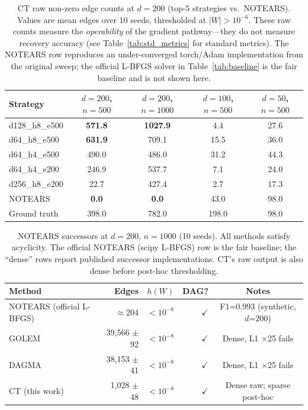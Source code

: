\documentclass[12pt,a4paper]{article}
\begin{document}
\begin{table}[H]
\centering
\caption{CT raw non-zero edge counts at $d=200$ (top-5 strategies vs.\ NOTEARS). Values are mean edges over 10 seeds, thresholded at $|W|>10^{-6}$. These raw counts measure the \emph{operability} of the gradient pathway---they do not measure recovery accuracy (see Table~\ref{tab:std_metrics} for standard metrics). The NOTEARS row reproduces an under-converged torch/Adam implementation from the original sweep; the official L-BFGS solver in Table~\ref{tab:baseline} is the fair baseline and is not shown here.}
\label{tab:activation}
\begin{tabular}{lcccc}
\toprule
Strategy & $d=200$, $n=500$ & $d=200$, $n=1000$ & $d=100$, $n=500$ & $d=50$, $n=500$ \\
\midrule
d128\_h8\_e500 & \textbf{571.8} & \textbf{1027.9} & 4.4 & 27.6 \\
d64\_h8\_e500  & \textbf{631.9} & 709.1 & 15.5 & 36.0 \\
d64\_h4\_e500  & 490.0 & 486.0 & 31.2 & 44.3 \\
d64\_h4\_e200  & 246.9 & 537.7 & 7.1 & 24.0 \\
d256\_h8\_e200 & 22.7 & 427.4 & 2.7 & 17.3 \\
\midrule
NOTEARS & \textbf{0.0} & \textbf{0.0} & 43.0 & 98.0 \\
Ground truth & 398.0 & 782.0 & 198.0 & 98.0 \\
\bottomrule
\end{tabular}
\end{table}
\newpage
\begin{table}[H]
\centering
\caption{NOTEARS successors at $d=200$, $n=1000$ (10 seeds). All methods satisfy acyclicity. The official NOTEARS (scipy L-BFGS) row is the fair baseline; the ``dense'' rows report published successor implementations. CT's raw output is also dense before post-hoc thresholding.}
\label{tab:golem_dagma}
\begin{tabular}{lrrrc}
\toprule
Method & Edges & $h(W)$ & DAG? & Notes \\
\midrule
NOTEARS (official L-BFGS) & $\approx$204 & $<10^{-8}$ & $\checkmark$ & F1=0.993 (synthetic, $d$=200) \\
GOLEM & 39,566 $\pm$ 92 & $<10^{-8}$ & $\checkmark$ & Dense, L1 $\times$25 fails \\
DAGMA & 38,153 $\pm$ 41 & $<10^{-8}$ & $\checkmark$ & Dense, L1 $\times$25 fails \\
CT (this work) & 1,028 $\pm$ 48 & $<10^{-8}$ & $\checkmark$ & Dense raw; sparse post-hoc \\
\bottomrule
\end{tabular}
\end{table}
\end{document}
